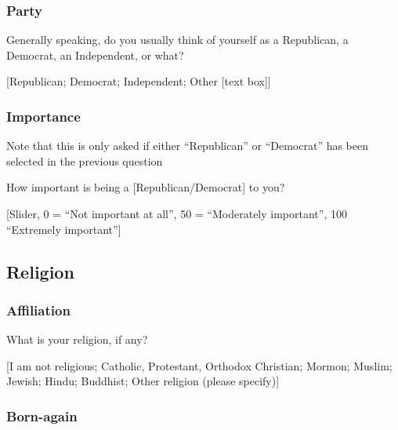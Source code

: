 \documentclass[
  letterpaper,
  DIV=11,
  numbers=noendperiod]{scrartcl}
\begin{document}
\subsubsection{Party}\label{party}

Generally speaking, do you usually think of yourself as a Republican, a
Democrat, an Independent, or what?

{[}Republican; Democrat; Independent; Other {[}text box{]}{]}

\subsubsection{Importance}\label{importance}

\begin{tcolorbox}[enhanced jigsaw, toprule=.15mm, toptitle=1mm, colframe=quarto-callout-note-color-frame, leftrule=.75mm, rightrule=.15mm, bottomtitle=1mm, coltitle=black, colbacktitle=quarto-callout-note-color!10!white, bottomrule=.15mm, breakable, opacityback=0, titlerule=0mm, title=\textcolor{quarto-callout-note-color}{\faInfo}\hspace{0.5em}{Note}, left=2mm, arc=.35mm, opacitybacktitle=0.6, colback=white]

Note that this is only asked if either ``Republican'' or ``Democrat''
has been selected in the previous question

\end{tcolorbox}

How important is being a {[}Republican/Democrat{]} to you?

{[}Slider, 0 = ``Not important at all'', 50 = ``Moderately important'',
100 ``Extremely important''{]}

\subsection{Religion}\label{religion}

\subsubsection{Affiliation}\label{affiliation}

What is your religion, if any?

{[}I am not religious; Catholic, Protestant, Orthodox Christian; Mormon;
Muslim; Jewish; Hindu; Buddhist; Other religion (please specify){]}

\subsubsection{Born-again}\label{born-again}
\end{document}
